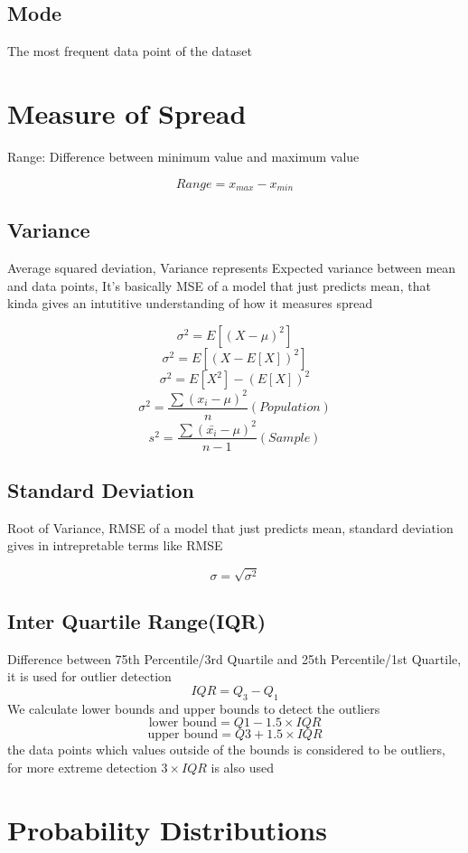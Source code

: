 \documentclass[12pt]{extarticle}
\begin{document}
\subsection{Mode}
The most frequent data point of the dataset  

\section{Measure of Spread}
Range: Difference between minimum value and maximum value 

$$ Range = x_{max} - x_{min} $$ 

\subsection{Variance}
Average squared deviation, Variance represents Expected variance between mean and data points,
It's basically MSE of a model that just predicts mean, that kinda gives an intutitive 
understanding of how it measures spread

$$\sigma^2 = E[(X - \mu)^2]$$
$$\sigma^2 = E[(X - E[X])^2]$$
$$\sigma^2 = E[X^2]-(E[X])^2$$
$$ \sigma^2 = \frac{\sum (x_i - \mu)^2}{n} (Population) $$ 
$$ s^2 = \frac{\sum( \bar{x_i} - \mu)^2}{n-1} (Sample)  $$ 

\subsection{Standard Deviation}
Root of Variance, 
RMSE of a model that just predicts mean, 
standard deviation gives in intrepretable terms like RMSE

$$ \sigma = \sqrt{\sigma^2} $$
\subsection{Inter Quartile Range(IQR)}
Difference between 75th Percentile/3rd Quartile and 25th Percentile/1st Quartile, 
it is used for outlier detection 
$$IQR = Q_3 - Q_1$$ 
We calculate lower bounds and upper bounds to detect the outliers
$$ \text{lower bound}= Q1-1.5 \times IQR$$
$$ \text{upper bound}= Q3+1.5 \times IQR$$
the data points which values outside of the bounds is considered to be outliers, for more extreme detection \(3 \times IQR\) is also used

\section{Probability Distributions}
\end{document}

